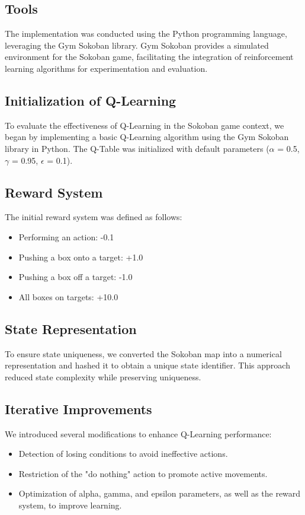 \documentclass[10pt,twocolumn]{article}
\begin{document}
\subsection{Tools}

The implementation was conducted using the Python programming language, leveraging the Gym Sokoban \cite{SchraderSokoban2018} library. Gym Sokoban provides a simulated environment for the Sokoban game, facilitating the integration of reinforcement learning algorithms for experimentation and evaluation.

\subsection{Initialization of Q-Learning}

To evaluate the effectiveness of Q-Learning in the Sokoban game context, we began by implementing a basic Q-Learning algorithm using the Gym Sokoban library in Python. The Q-Table was initialized with default parameters ($\alpha$ = 0.5, $\gamma$ = 0.95, $\epsilon$ = 0.1).

\subsection{Reward System}

The initial reward system was defined as follows:
\begin{itemize}
    \item Performing an action: -0.1
    \item Pushing a box onto a target: +1.0
    \item Pushing a box off a target: -1.0
    \item All boxes on targets: +10.0
\end{itemize}

\subsection{State Representation}

To ensure state uniqueness, we converted the Sokoban map into a numerical representation and hashed it to obtain a unique state identifier. This approach reduced state complexity while preserving uniqueness.

\subsection{Iterative Improvements}

We introduced several modifications to enhance Q-Learning performance:
\begin{itemize}
    \item Detection of losing conditions to avoid ineffective actions.
    \item Restriction of the "do nothing" action to promote active movements.
    \item Optimization of alpha, gamma, and epsilon parameters, as well as the reward system, to improve learning.
\end{itemize}
\end{document}
